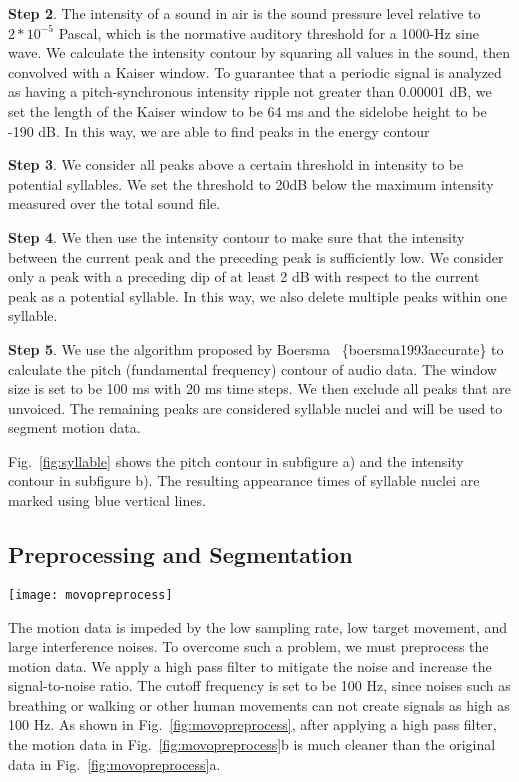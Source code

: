 \textbf{Step 2}. 
The intensity of a sound in air is the sound pressure level relative to $2*10^{-5}$ Pascal, which is the normative auditory threshold for a 1000-Hz sine wave. We calculate the intensity contour by squaring all values in the sound, then convolved with a Kaiser window. To guarantee that a periodic signal is analyzed as having a pitch-synchronous intensity ripple not greater than 0.00001 dB, we set the length of the Kaiser window to be 64 ms and the sidelobe height to be -190 dB. In this way, we are able to find peaks in the energy contour



\textbf{Step 3}. We consider all peaks above a certain threshold
in intensity to be potential syllables. We set the threshold
to 20dB below the maximum intensity measured over the
total sound file.

\textbf{Step 4}. We then use the intensity contour to make sure that the intensity between the current peak and the preceding peak is sufficiently low. We consider only a peak with a preceding dip of at least 2 dB with respect to the current peak as a potential syllable. In this way, we also delete multiple peaks within one syllable.

\textbf{Step 5}.
We use the algorithm proposed by Boersma ~\{boersma1993accurate\} to calculate the pitch (fundamental frequency) contour of audio data. The window size is set to be 100 ms with 20 ms time steps. We then exclude all peaks that are unvoiced. The remaining peaks are considered syllable nuclei and will be used to segment motion data.

Fig.~\ref{fig:syllable} shows the pitch contour in subfigure a) and the intensity contour in subfigure b). The resulting appearance times of syllable nuclei are marked using blue vertical lines.





%
\subsection{Preprocessing and Segmentation}
\begin{figure*}[h]
	\centering
	\texttt{[image: movopreprocess]}
	\caption{Preprocessing and Segmentation. }
	\label{fig:movopreprocess}
\end{figure*}
The motion data is impeded by the low sampling rate, low target movement, and large interference noises. To overcome such a problem, we must preprocess the motion data. We apply a high pass filter to mitigate the noise and increase the signal-to-noise ratio. The cutoff frequency is set to be 100 Hz, since noises such as breathing or walking or other human movements can not create signals as high as 100 Hz. As shown in Fig.~\ref{fig:movopreprocess}, after applying a high pass filter, the motion data in Fig.~\ref{fig:movopreprocess}b is much cleaner than the original data in Fig.~\ref{fig:movopreprocess}a. 

